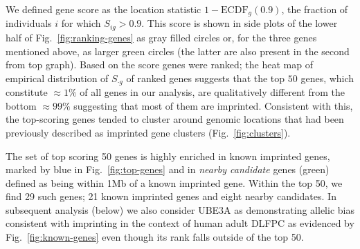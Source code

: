 \documentclass[letterpaper]{article}
\begin{document}
We defined gene score as
the location statistic \(1 - \mathrm{ECDF}_g(0.9)\), the fraction of
individuals \(i\) for which \(S_{ig}>0.9\).  This score is shown in side plots
of the lower half of Fig.~\ref{fig:ranking-genes} as gray filled circles or,
for the three genes mentioned above, as larger green circles (the latter are
also present in the second from top graph).  Based on the score genes were
ranked; the heat map of empirical distribution of \(S_{\cdot g}\) of ranked
genes suggests that the top \(50\) genes, which constitute \(\approx
1\%\) of all genes in our analysis, are qualitatively different from the
bottom \(\approx 99\%\) suggesting that most of them are imprinted.
Consistent with this, the top-scoring genes tended to cluster around genomic
locations that had been previously described as imprinted gene clusters
(Fig.~\ref{fig:clusters}).

The set of top scoring 50 genes is highly enriched in known imprinted genes,
marked by blue in Fig.~\ref{fig:top-genes} and in \emph{nearby candidate}
genes (green) defined as being within 1Mb of a known imprinted gene. Within
the top 50, we find 29 such genes; 21 known imprinted genes and eight nearby
candidates.  In subsequent analysis (below) we also consider UBE3A as
demonstrating allelic bias consistent with imprinting in the context of human
adult DLFPC as evidenced by Fig.~\ref{fig:known-genes} even though its rank
falls outside of the top 50.
\end{document}
